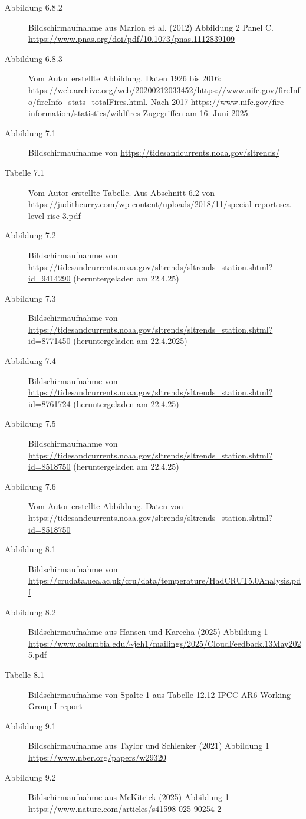 \documentclass[12pt,paper=a4,DIV=12,parskip=never,chapterprefix=false,headings=standardclasses]{scrreprt}
\begin{document}
\begin{description}
\item[Abbildung 6.8.2] Bildschirmaufnahme aus Marlon et al. (2012) Abbildung 2 Panel C. \url{https://www.pnas.org/doi/pdf/10.1073/pnas.1112839109}
\item[Abbildung 6.8.3] Vom Autor erstellte Abbildung. Daten 1926 bis 2016: \url{https://web.archive.org/web/20200212033452/https://www.nifc.gov/fireInfo/fireInfo_stats_totalFires.html}. Nach 2017 \url{https://www.nifc.gov/fire-information/statistics/wildfires} Zugegriffen am 16. Juni 2025.
\item[Abbildung 7.1] Bildschirmaufnahme von \url{https://tidesandcurrents.noaa.gov/sltrends/}
\item[Tabelle 7.1] Vom Autor erstellte Tabelle. Aus Abschnitt 6.2 von \url{https://judithcurry.com/wp-content/uploads/2018/11/special-report-sea-level-rise-3.pdf}
\item[Abbildung 7.2] Bildschirmaufnahme von \url{https://tidesandcurrents.noaa.gov/sltrends/sltrends_station.shtml?id=9414290} (heruntergeladen am 22.4.25)
\item[Abbildung 7.3] Bildschirmaufnahme von \url{https://tidesandcurrents.noaa.gov/sltrends/sltrends_station.shtml?id=8771450} (heruntergeladen am 22.4.2025)
\item[Abbildung 7.4] Bildschirmaufnahme von \url{https://tidesandcurrents.noaa.gov/sltrends/sltrends_station.shtml?id=8761724} (heruntergeladen am 22.4.25)
\item[Abbildung 7.5] Bildschirmaufnahme von \url{https://tidesandcurrents.noaa.gov/sltrends/sltrends_station.shtml?id=8518750} (heruntergeladen am 22.4.25)
\item[Abbildung 7.6] Vom Autor erstellte Abbildung. Daten von \url{https://tidesandcurrents.noaa.gov/sltrends/sltrends_station.shtml?id=8518750}
\item[Abbildung 8.1] Bildschirmaufnahme von \url{https://crudata.uea.ac.uk/cru/data/temperature/HadCRUT5.0Analysis.pdf}
\item[Abbildung 8.2] Bildschirmaufnahme aus Hansen und Karecha (2025) Abbildung 1 \url{https://www.columbia.edu/~jeh1/mailings/2025/CloudFeedback.13May2025.pdf}
\item[Tabelle 8.1] Bildschirmaufnahme von Spalte 1 aus Tabelle 12.12 IPCC AR6 Working Group I report
\item[Abbildung 9.1] Bildschirmaufnahme aus Taylor und Schlenker (2021) Abbildung 1 \url{https://www.nber.org/papers/w29320}
\item[Abbildung 9.2] Bildschirmaufnahme aus McKitrick (2025) Abbildung 1 \url{https://www.nature.com/articles/s41598-025-90254-2}

\end{description}
\end{document}

